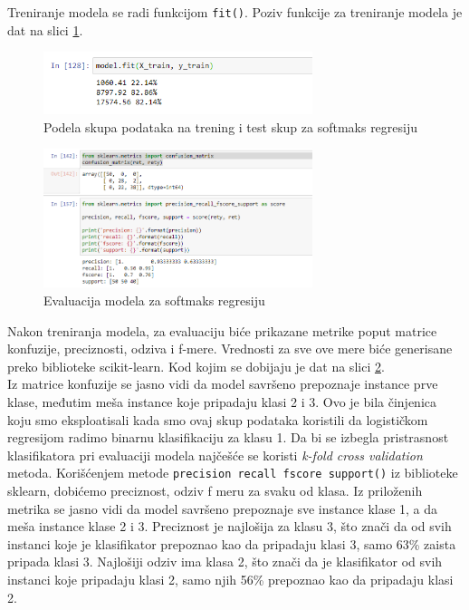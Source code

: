 \documentclass[a4paper,12pt]{report}
\begin{document}
Treniranje modela se radi funkcijom \texttt{fit()}. Poziv funkcije za treniranje modela je dat na slici \ref{fig:softtrain}. \\

\begin{figure}[h]
    \centering
    \includegraphics[width=0.7\textwidth]{softmax_train.png}
    \caption{Podela skupa podataka na trening i test skup za softmaks regresiju}\label{fig:softtrain}
\end{figure}

\begin{figure}[h]
    \centering
    \includegraphics[width=0.7\textwidth]{softmax_evaluation.png}
    \caption{Evaluacija modela za softmaks regresiju}\label{fig:softmaxeval}
\end{figure}

Nakon treniranja modela, za evaluaciju biće prikazane metrike poput matrice konfuzije, preciznosti, odziva i f-mere. Vrednosti za sve ove mere biće generisane preko biblioteke scikit-learn. Kod kojim se dobijaju je dat na slici \ref{fig:softmaxeval}. \\

Iz matrice konfuzije se jasno vidi da model savršeno prepoznaje instance prve klase, međutim meša instance koje pripadaju klasi 2 i 3. Ovo je bila činjenica koju smo eksploatisali kada smo ovaj skup podataka koristili da logističkom regresijom radimo binarnu klasifikaciju za klasu 1. Da bi se izbegla pristrasnost klasifikatora pri evaluaciji modela najčešće se koristi \textit{k-fold cross validation} metoda. Korišćenjem metode \texttt{precision recall fscore support()} iz biblioteke sklearn, dobićemo preciznost, odziv f meru za svaku od klasa. Iz priloženih metrika se jasno vidi da model savršeno prepoznaje sve instance klase 1, a da meša instance klase 2 i 3. Preciznost je najlošija za klasu 3, što znači da od svih instanci koje je klasifikator prepoznao kao da pripadaju klasi 3, samo 63\% zaista pripada klasi 3. Najlošiji odziv ima klasa 2, što znači da je klasifikator od svih instanci koje pripadaju klasi 2, samo njih 56\% prepoznao kao da pripadaju klasi 2. \\
\end{document}
